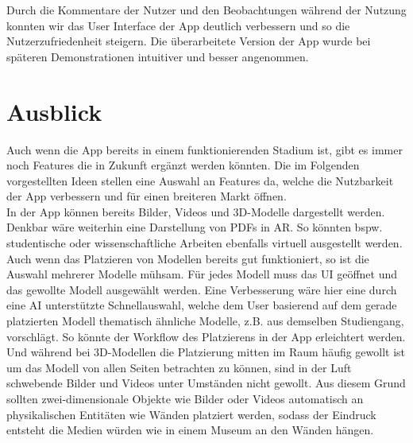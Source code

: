 \documentclass[12pt,a4paper]{article}
\begin{document}
Durch die Kommentare der Nutzer und den Beobachtungen während der Nutzung konnten wir das User Interface der App deutlich verbessern und so die Nutzerzufriedenheit steigern. Die überarbeitete Version der App wurde bei späteren Demonstrationen intuitiver und besser angenommen.
\section{Ausblick}
Auch wenn die App bereits in einem funktionierenden Stadium ist, gibt es immer noch Features die in Zukunft ergänzt werden könnten. Die im Folgenden vorgestellten Ideen stellen eine Auswahl an Features da, welche die Nutzbarkeit der App verbessern und für einen breiteren Markt öffnen.\\
In der App können bereits Bilder, Videos und 3D-Modelle dargestellt werden. Denkbar wäre weiterhin eine Darstellung von PDFs in AR. So könnten bspw. studentische oder wissenschaftliche Arbeiten ebenfalls virtuell ausgestellt werden.\\
Auch wenn das Platzieren von Modellen bereits gut funktioniert, so ist die Auswahl mehrerer Modelle mühsam. Für jedes Modell muss das UI geöffnet und das gewollte Modell ausgewählt werden. Eine Verbesserung wäre hier eine durch eine AI unterstützte Schnellauswahl, welche dem User basierend auf dem gerade platzierten Modell thematisch ähnliche Modelle, z.B. aus demselben Studiengang, vorschlägt. So könnte der Workflow des Platzierens in der App erleichtert werden.\\
Und während bei 3D-Modellen die Platzierung mitten im Raum häufig gewollt ist um das Modell von allen Seiten betrachten zu können, sind in der Luft schwebende Bilder und Videos unter Umständen nicht gewollt. Aus diesem Grund sollten zwei-dimensionale Objekte wie Bilder oder Videos automatisch an physikalischen Entitäten wie Wänden platziert werden, sodass der Eindruck entsteht die Medien würden wie in einem Museum an den Wänden hängen.\\
\end{document}
